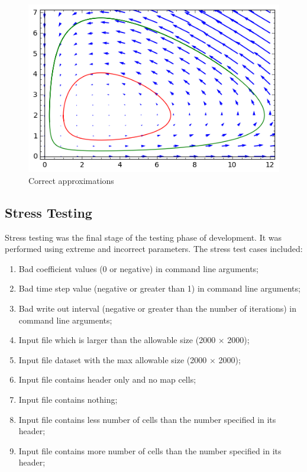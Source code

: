 \documentclass[12pt,a4paper]{article}
\begin{document}
\begin{figure}[hb]
    \centering
    \includegraphics[scale=0.75]{images/sage1.png}
    \caption{Correct approximations}
\end{figure}

\clearpage

\subsection{Stress Testing}

Stress testing was the final stage of the testing phase of development. It was performed using extreme and incorrect parameters. The stress test cases included:

\begin{enumerate}

\item Bad coefficient values (0 or negative) in command line arguments;
\item Bad time step value (negative or greater than 1) in command line arguments;
\item Bad write out interval (negative or greater than the number of iterations) in command line arguments;
\item Input file which is larger than the allowable size (2000 $\times$ 2000);
\item Input file dataset with the max allowable size (2000 $\times$ 2000);
\item Input file contains header only and no map cells;
\item Input file contains nothing;
\item Input file contains less number of cells than the number specified in its header;
\item Input file contains more number of cells than the number specified in its header;

\end{enumerate}
\end{document}
